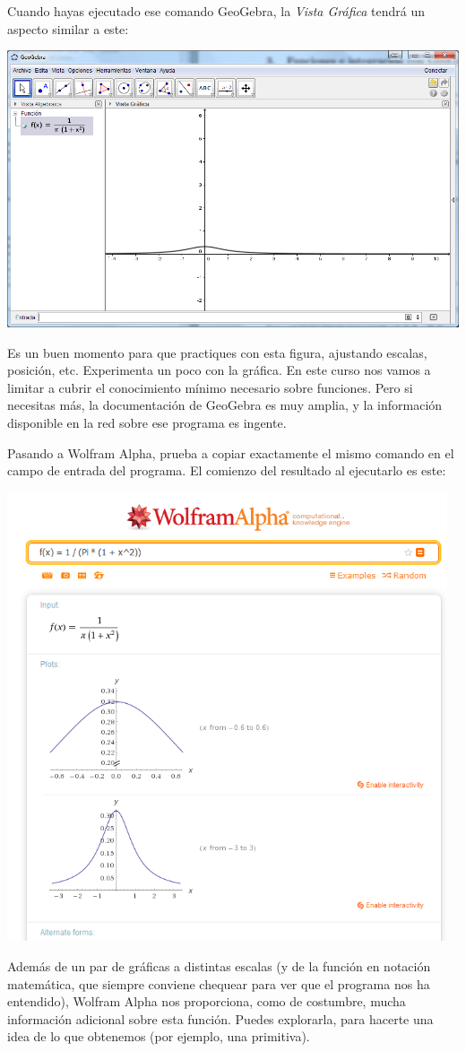 \documentclass[10pt,a4paper]{article}\usepackage[]{graphicx}\usepackage[]{color}
\begin{document}
Cuando hayas ejecutado ese comando GeoGebra, la {\em Vista Gráfica} tendrá un aspecto similar a este:
\begin{center}
    \includegraphics[width=15cm]{../fig/Tut05-35.png}
\end{center}

Es un buen momento para que practiques con esta figura, ajustando escalas, posición, etc. Experimenta un poco con la gráfica. En este curso nos vamos a limitar a cubrir el conocimiento mínimo necesario sobre funciones. Pero si necesitas más, la documentación de GeoGebra es muy amplia, y la información disponible en la red sobre ese programa es ingente.

Pasando a Wolfram Alpha, prueba a copiar exactamente el mismo comando en el campo de entrada del programa. El comienzo del resultado al ejecutarlo es este:
\begin{center}
    \includegraphics[width=13cm]{../fig/Tut05-36.png}
\end{center}
Además de un par de gráficas a distintas escalas (y de la función en notación matemática, que siempre conviene chequear para ver que el programa nos ha entendido), Wolfram Alpha nos proporciona, como de costumbre, mucha información adicional sobre esta función. Puedes explorarla, para hacerte una idea de lo que obtenemos (por ejemplo, una primitiva).
\end{document}

